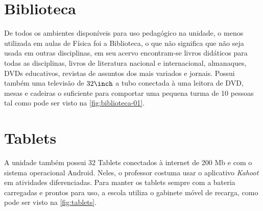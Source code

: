 \section{Biblioteca} %
\label{sec:Biblioteca}
De todos os ambientes disponíveis para uso pedagógico na unidade, o menos utilizada em aulas de Física foi a Biblioteca, o que não significa que não seja usada em outras disciplinas, em seu acervo encontram-se livros didáticos para todas as disciplinas, livros de literatura nacional e internacional, almanaques, \acp{DVD} educativos, revistas de assuntos dos mais variados e jornais. Possui também uma televisão de $32\inch$ a tubo conectada à uma leitora de \ac{DVD}, mesas e cadeiras o suficiente para comportar uma pequena turma de 10 pessoas tal como pode ser visto na \autoref{fig:biblioteca-01}.

\section{Tablets} %
\label{sec:Tablets}
A unidade também possui 32 Tablets conectados à internet de 200 Mb e com o sistema operacional Android. Neles, o professor costuma usar o aplicativo \emph{Kahoot} em atividades diferenciadas. Para manter os tablets sempre com a bateria carregadas e prontos para uso, a escola utiliza o gabinete móvel de recarga, como pode ser visto na \autoref{fig:tablets}.
\vspace{15pt}


